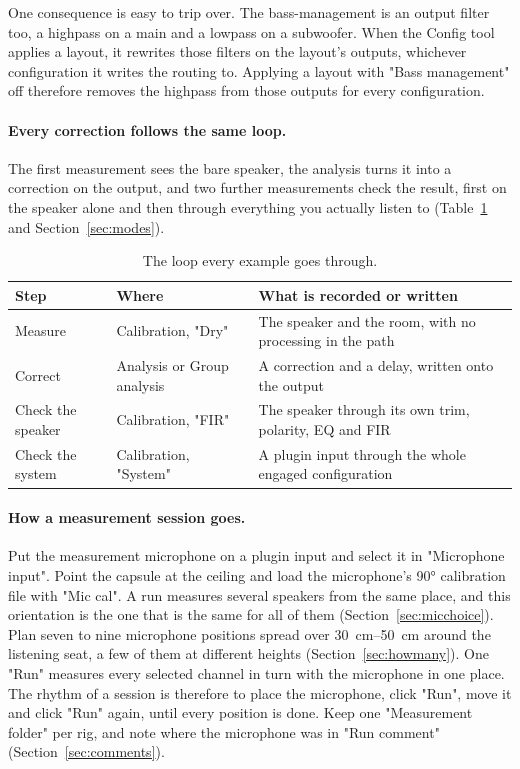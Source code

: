 One consequence is easy to trip over. The bass-management  is an output filter too, a highpass on a main and a lowpass on a subwoofer. When the Config tool applies a layout, it rewrites those filters on the layout's outputs, whichever configuration it writes the routing to. Applying a layout with "Bass management" off therefore removes the highpass from those outputs for every configuration.

\paragraph{Every correction follows the same loop.} The first measurement sees the bare speaker, the analysis turns it into a correction on the output, and two further measurements check the result, first on the speaker alone and then through everything you actually listen to (Table~\ref{tab:loop} and Section~\ref{sec:modes}).

\begin{table}[h]\centering
\begin{tabularx}{\textwidth}{l l X}
\toprule
Step & Where & What is recorded or written \\
\midrule
Measure & Calibration, "Dry" & The speaker and the room, with no processing in the path \\
Correct & Analysis or Group analysis & A correction and a delay, written onto the output \\
Check the speaker & Calibration, "FIR" & The speaker through its own trim, polarity, EQ and FIR \\
Check the system & Calibration, "System" & A plugin input through the whole engaged configuration \\
\bottomrule
\end{tabularx}
\caption{The loop every example goes through.}\label{tab:loop}
\end{table}

\paragraph{How a measurement session goes.} Put the measurement microphone on a plugin input and select it in "Microphone input". Point the capsule at the ceiling and load the microphone's \ang{90} calibration file with "Mic cal". A run measures several speakers from the same place, and this orientation is the one that is the same for all of them (Section~\ref{sec:micchoice}). Plan seven to nine microphone positions spread over \SIrange{30}{50}{\centi\metre} around the listening seat, a few of them at different heights (Section~\ref{sec:howmany}). One "Run" measures every selected channel in turn with the microphone in one place. The rhythm of a session is therefore to place the microphone, click "Run", move it and click "Run" again, until every position is done. Keep one "Measurement folder" per rig, and note where the microphone was in "Run comment" (Section~\ref{sec:comments}).

